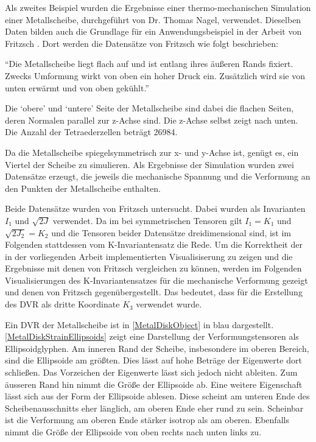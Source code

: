 \documentclass[a4paper,fontsize=12pt,toc=bib,halfparskip,ngerman]{scrartcl}
\begin{document}
Als zweites Beispiel wurden die Ergebnisse einer thermo-mechanischen Simulation einer Metallscheibe, durchgef\"uhrt von Dr. Thomas Nagel, verwendet. Dieselben Daten bilden auch die Grundlage f\"ur ein Anwendungsbeispiel in der Arbeit von Fritzsch \cite[S.15,~45~ ff.]{fritzsch2016continuousScatterplot}. Dort werden die Datens\"atze von Fritzsch wie folgt beschrieben:

``Die Metallscheibe liegt flach auf und ist entlang ihres \"au{\ss}eren Rands fixiert. Zwecks Umformung wirkt von oben ein hoher Druck ein. Zus\"atzlich wird sie von unten erw\"armt und von oben gek\"uhlt.''\cite[S.~15]{fritzsch2016continuousScatterplot}

Die `obere' und `untere' Seite der Metallscheibe sind dabei die flachen Seiten, deren Normalen parallel zur z-Achse sind. Die z-Achse selbst zeigt nach unten. Die Anzahl der Tetraederzellen betr\"agt 26984.

Da die Metallscheibe spiegelsymmetrisch zur x- und y-Achse ist, gen\"ugt es, ein Viertel der Scheibe zu simulieren. Als Ergebnisse der Simulation wurden zwei Datens\"atze erzeugt, die jeweils die mechanische Spannung und die Verformung an den Punkten der Metallscheibe enthalten. 

Beide Datens\"atze wurden von Fritzsch untersucht. Dabei wurden als Invarianten $I_1$ und $\sqrt{2J}$ verwendet. Da im bei symmetrischen Tensoren gilt $I_1 = K_1$ und $\sqrt{2J_2} = K_2$ und die Tensoren beider Datens\"atze dreidimensional sind, ist im Folgenden stattdessen vom K-Invariantensatz die Rede. Um die Korrektheit der in der vorliegenden Arbeit implementierten Visualisiserung zu zeigen und die Ergebnisse mit denen von Fritzsch vergleichen zu k\"onnen, werden im Folgenden Visualisierungen des K-Invariantensatzes f\"ur die mechanische Verformung gezeigt und denen von Fritzsch gegen\"ubergestellt. Das bedeutet, dass f\"ur die Erstellung des DVR als dritte Koordinate $K_3$ verwendet wurde.

Ein DVR der Metallscheibe ist in \cref{MetalDiskObject} in blau dargestellt. \cref{MetalDiskStrainEllipsoids} zeigt eine Darstellung der Verformungstensoren als Ellipsoidglyphen. Am inneren Rand der Scheibe, insbesondere im oberen Bereich, sind die Ellipsoide am gr\"o{\ss}ten. Dies l\"asst auf hohe Betr\"age der Eigenwerte dort schlie{\ss}en. Das Vorzeichen der Eigenwerte l\"asst sich jedoch nicht ableiten. Zum \"ausseren Rand hin nimmt die Gr\"o{\ss}e der Ellipsoide ab. Eine weitere Eigenschaft l\"asst sich aus der Form der Ellipsoide ablesen. Diese scheint am unteren Ende des Scheibenausschnitts eher l\"anglich, am oberen Ende eher rund zu sein. Scheinbar ist die Verformung am oberen Ende st\"arker isotrop als am oberen. Ebenfalls nimmt die Gr\"o{\ss}e der Ellipsoide von oben rechts nach unten links zu.
\end{document}
